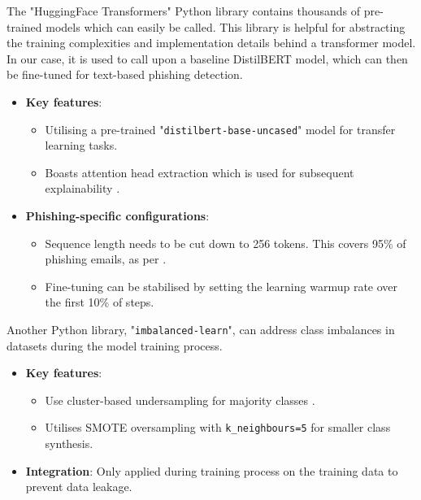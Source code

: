 \noindent The "HuggingFace Transformers" Python library contains thousands of pre-trained models which can easily be called. This library is helpful for abstracting the training complexities and implementation details behind a transformer model. In our case, it is used to call upon a baseline DistilBERT model, which can then be fine-tuned for text-based phishing detection.

\begin{itemize}
  \item \textbf{Key features}:
  \begin{itemize}
    \item Utilising a pre-trained "\texttt{distilbert-base-uncased}" model for transfer learning tasks.
    \item Boasts attention head extraction which is used for subsequent explainability \citep{vo2024securing}.
  \end{itemize}
  \item \textbf{Phishing-specific configurations}:
  \begin{itemize}
    \item Sequence length needs to be cut down to 256 tokens. This covers 95\% of phishing emails, as per \cite{sanchez2022phishing}.
    \item Fine-tuning can be stabilised by setting the learning warmup rate over the first 10\% of steps.
  \end{itemize}
\end{itemize}

\noindent Another Python library, "\texttt{imbalanced-learn}", can address class imbalances in datasets during the model training process.

\begin{itemize}
  \item \textbf{Key features}:
  \begin{itemize}
    \item Use cluster-based undersampling for majority classes \citep{zamir2020phishing}.
    \item Utilises SMOTE oversampling with \texttt{k\_neighbours=5} for smaller class synthesis.
  \end{itemize}
  \item \textbf{Integration}: Only applied during training process on the training data to prevent data leakage.
\end{itemize}
